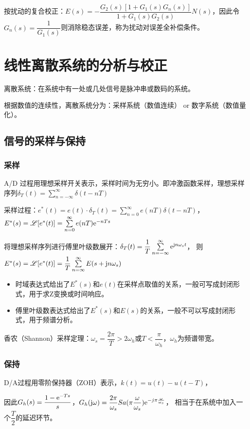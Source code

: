 \documentclass[11pt,a4paper]{ctexart}
\newcommand{\e}{{\rm e}}
\renewcommand{\j}{{\rm j}}
\begin{document}
        按扰动的复合校正：$E(s)=-\dfrac{G_2(s)[1+G_1(s)G_n(s)]}{1+G_1(s)G_2(s)}N(s)$，因此令$G_n(s)=\dfrac{1}{G_1(s)}$则消除稳态误差，称为扰动对误差全补偿条件。
\newpage
\section{线性离散系统的分析与校正}
    离散系统：在系统中有一处或几处信号是脉冲串或数码的系统。

    根据数值的连续性，离散系统分为：采样系统（数值连续） or 数字系统（数值量化）。
    \subsection{信号的采样与保持}
        \subsubsection{采样}
            A/D 过程用理想采样开关表示，采样时间为无穷小。即冲激函数采样，理想采样序列$\delta_T(t)=\sum\limits_{n=-\infty}^{\infty}\delta(t-nT)$

            采样过程：$e^*(t)=e(t)\cdot\delta_T(t)=\sum\limits_{n=0}^{\infty}e(nT)\delta(t-nT)$，$E^*(s)=\mathscr{L}[e^*(t)]=\sum\limits_{n=0}^{\infty}e(nT)\e^{-nTs}$

            将理想采样序列进行傅里叶级数展开：$\delta_T(t)=\dfrac{1}{T}\sum\limits_{n=-\infty}^{\infty}\e^{\j n\omega_st}$，
            则$E^*(s)=\mathscr{L}[e^*(t)]=\dfrac1T\sum\limits_{n=\infty}^{\infty}E(s+\j n\omega_s)$
    
            \begin{itemize}
                \item 时域表达式给出了$E^*(s)$和$e(t)$在采样点取值的关系，一般可写成封闭形式，用于求Z变换或时间响应。
                \item 傅里叶级数表达式给出了$E^*(s)$和$E(s)$的关系，一般不可以写成封闭形式，用于频谱分析。
            \end{itemize}
                
            香农（Shannon）采样定理：$\omega_s=\dfrac{2\pi}{T}>2\omega_h$或$T<\dfrac{\pi}{\omega_h}$，$\omega_h$为频谱带宽。
        \subsubsection{保持}
            D/A过程用零阶保持器（ZOH）表示，$k(t)=u(t)-u(t-T)$，
            
            因此$G_h(s)=\dfrac{1-\e^{-Ts}}{s}$，$G_h(\j\omega)=\dfrac{2\pi}{\omega_s}Sa(\pi\dfrac{\omega}{\omega_s})\e^{-j\pi\frac{\omega}{\omega_s}}$，
            相当于在系统中加入一个$\dfrac{T}{2}$的延迟环节。
\end{document}
